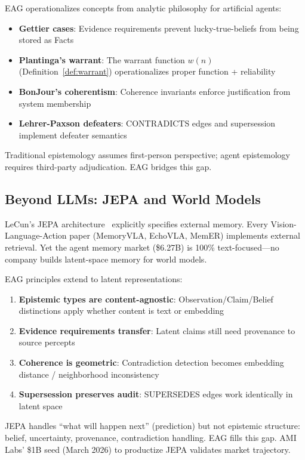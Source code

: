 \documentclass[11pt,a4paper]{article}
\begin{document}
EAG operationalizes concepts from analytic philosophy for artificial agents:

\begin{itemize}[noitemsep]
    \item \textbf{Gettier cases}: Evidence requirements prevent lucky-true-beliefs from being stored as Facts
    \item \textbf{Plantinga's warrant}: The warrant function $w(n)$ (Definition~\ref{def:warrant}) operationalizes proper function + reliability
    \item \textbf{BonJour's coherentism}: Coherence invariants enforce justification from system membership
    \item \textbf{Lehrer-Paxson defeaters}: CONTRADICTS edges and supersession implement defeater semantics
\end{itemize}

Traditional epistemology assumes first-person perspective; agent epistemology requires third-party adjudication. EAG bridges this gap.

\subsection{Beyond LLMs: JEPA and World Models}

LeCun's JEPA architecture~\cite{lecun2022path} explicitly specifies external memory. Every Vision-Language-Action paper (MemoryVLA, EchoVLA, MemER) implements external retrieval. Yet the agent memory market (\$6.27B) is 100\% text-focused---no company builds latent-space memory for world models.

EAG principles extend to latent representations:
\begin{enumerate}[noitemsep]
    \item \textbf{Epistemic types are content-agnostic}: Observation/Claim/Belief distinctions apply whether content is text or embedding
    \item \textbf{Evidence requirements transfer}: Latent claims still need provenance to source percepts
    \item \textbf{Coherence is geometric}: Contradiction detection becomes embedding distance / neighborhood inconsistency
    \item \textbf{Supersession preserves audit}: SUPERSEDES edges work identically in latent space
\end{enumerate}

JEPA handles ``what will happen next'' (prediction) but not epistemic structure: belief, uncertainty, provenance, contradiction handling. EAG fills this gap. AMI Labs' \$1B seed (March 2026) to productize JEPA validates market trajectory.
\end{document}
